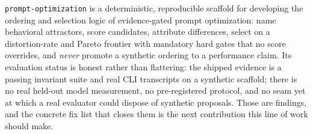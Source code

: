 \texttt{prompt-optimization} is a deterministic, reproducible scaffold for
developing the ordering and selection logic of evidence-gated prompt
optimization: name behavioral attractors, score candidates, attribute
differences, select on a distortion-rate and Pareto frontier with mandatory hard
gates that no score overrides, and \emph{never} promote a synthetic ordering to a
performance claim. Its evaluation status is honest rather than flattering: the
shipped evidence is a passing invariant suite and real CLI transcripts on a
synthetic scaffold; there is no real held-out model measurement, no
pre-registered protocol, and no seam yet at which a real evaluator could dispose
of synthetic proposals. Those are findings, and the concrete fix list that
closes them is the next contribution this line of work should make.